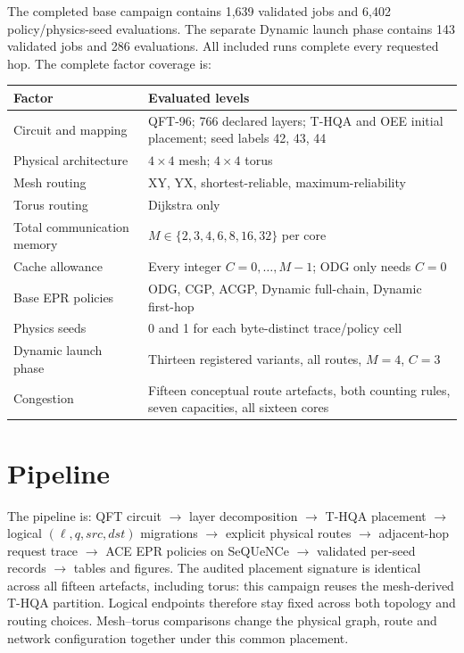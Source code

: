 \documentclass[10pt,a4paper,oneside]{report}
\begin{document}
The completed base campaign contains 1,639 validated jobs and 6,402 policy/physics-seed evaluations. The separate Dynamic launch phase contains 143 validated jobs and 286 evaluations. All included runs complete every requested hop. The complete factor coverage is:
\begin{center}\small
\begin{tabular}{p{.25\linewidth}p{.65\linewidth}}\toprule
Factor & Evaluated levels\\\midrule
Circuit and mapping & QFT-96; 766 declared layers; T-HQA and OEE initial placement; seed labels 42, 43, 44\\
Physical architecture & $4\times4$ mesh; $4\times4$ torus\\
Mesh routing & XY, YX, shortest-reliable, maximum-reliability\\
Torus routing & Dijkstra only\\
Total communication memory & $M\in\{2,3,4,6,8,16,32\}$ per core\\
Cache allowance & Every integer $C=0,\ldots,M-1$; ODG only needs $C=0$\\
Base EPR policies & ODG, CGP, ACGP, Dynamic full-chain, Dynamic first-hop\\
Physics seeds & 0 and 1 for each byte-distinct trace/policy cell\\
Dynamic launch phase & Thirteen registered variants, all routes, $M=4$, $C=3$\\
Congestion & Fifteen conceptual route artefacts, both counting rules, seven capacities, all sixteen cores\\\bottomrule
\end{tabular}\end{center}

\section{Pipeline}
The pipeline is: QFT circuit $\to$ layer decomposition $\to$ T-HQA placement $\to$ logical $(\ell,q,src,dst)$ migrations $\to$ explicit physical routes $\to$ adjacent-hop request trace $\to$ ACE EPR policies on SeQUeNCe $\to$ validated per-seed records $\to$ tables and figures. The audited placement signature is identical across all fifteen artefacts, including torus: this campaign reuses the mesh-derived T-HQA partition. Logical endpoints therefore stay fixed across both topology and routing choices. Mesh--torus comparisons change the physical graph, route and network configuration together under this common placement.
\end{document}
